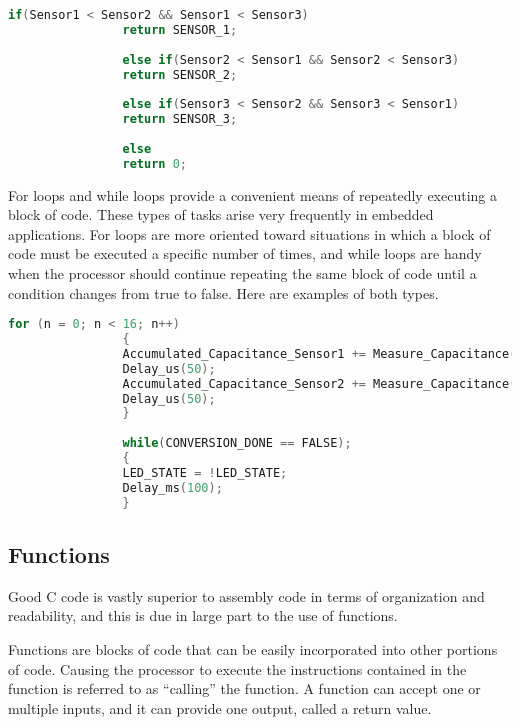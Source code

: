                 \begin{lstlisting}[backgroundcolor = \color{lightgray}, language=c]
                if(Sensor1 < Sensor2 && Sensor1 < Sensor3)
                return SENSOR_1;
                
                else if(Sensor2 < Sensor1 && Sensor2 < Sensor3)
                return SENSOR_2;
                
                else if(Sensor3 < Sensor2 && Sensor3 < Sensor1)
                return SENSOR_3;
                
                else
                return 0;
                \end{lstlisting} 

            For loops and while loops provide a convenient means of repeatedly executing a block of code. These types of tasks arise very frequently in embedded applications. For loops are more oriented toward situations in which a block of code must be executed a specific number of times, and while loops are handy when the processor should continue repeating the same block of code until a condition changes from true to false. Here are examples of both types.

                \begin{lstlisting}[backgroundcolor = \color{lightgray}, language=c]
                for (n = 0; n < 16; n++)
                {
                Accumulated_Capacitance_Sensor1 += Measure_Capacitance(SENSOR_1);
                Delay_us(50);
                Accumulated_Capacitance_Sensor2 += Measure_Capacitance(SENSOR_2);
                Delay_us(50);
                }
                
                while(CONVERSION_DONE == FALSE);
                {
                LED_STATE = !LED_STATE;
                Delay_ms(100);
                }
                \end{lstlisting}
                
        \subsection{Functions} 

            Good C code is vastly superior to assembly code in terms of organization and readability, and this is due in large part to the use of functions.
            
            Functions are blocks of code that can be easily incorporated into other portions of code. Causing the processor to execute the instructions contained in the function is referred to as “calling” the function. A function can accept one or multiple inputs, and it can provide one output, called a return value.
            

